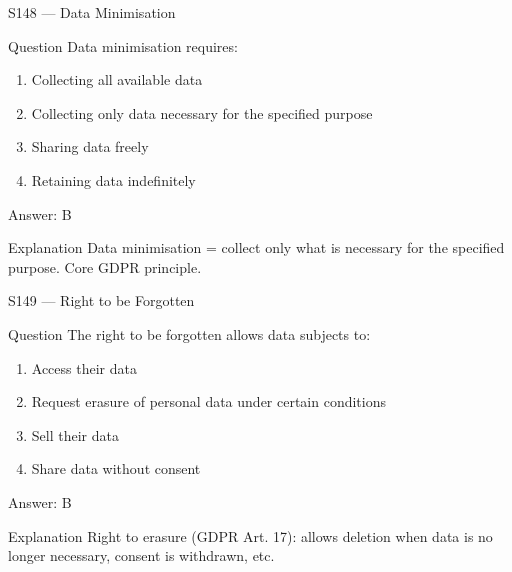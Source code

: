 \documentclass[aspectratio=169,8pt]{beamer}
\begin{document}
	\begin{frame}{S148 --- Data Minimisation}
		\begin{block}{Question}
			Data minimisation requires:
			\begin{enumerate}
				\item Collecting all available data
				\item Collecting only data necessary for the specified purpose
				\item Sharing data freely
				\item Retaining data indefinitely
			\end{enumerate}
		\end{block}
		\begin{exampleblock}{Answer: B}\end{exampleblock}
		\begin{block}{Explanation}
			Data minimisation = collect only what is necessary for the specified purpose. Core GDPR principle.
		\end{block}
	\end{frame}
	
	\begin{frame}{S149 --- Right to be Forgotten}
		\begin{block}{Question}
			The right to be forgotten allows data subjects to:
			\begin{enumerate}
				\item Access their data
				\item Request erasure of personal data under certain conditions
				\item Sell their data
				\item Share data without consent
			\end{enumerate}
		\end{block}
		\begin{exampleblock}{Answer: B}\end{exampleblock}
		\begin{block}{Explanation}
			Right to erasure (GDPR Art. 17): allows deletion when data is no longer necessary, consent is withdrawn, etc.
		\end{block}
	\end{frame}
	
\end{document}
